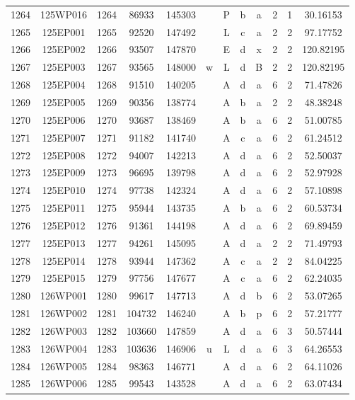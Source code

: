 \begin{tabular}{|*{12}{c|}}
1264 & 125WP016 & 1264 & 86933 & 145303 &  & P & b & a & 2 & 1 & 30.16153 \\ 
1265 & 125EP001 & 1265 & 92520 & 147492 &  & L & c & a & 2 & 2 & 97.17752 \\ 
1266 & 125EP002 & 1266 & 93507 & 147870 &  & E & d & x & 2 & 2 & 120.82195 \\ 
1267 & 125EP003 & 1267 & 93565 & 148000 & w & L & d & B & 2 & 2 & 120.82195 \\ 
1268 & 125EP004 & 1268 & 91510 & 140205 &  & A & d & a & 6 & 2 & 71.47826 \\ 
1269 & 125EP005 & 1269 & 90356 & 138774 &  & A & b & a & 2 & 2 & 48.38248 \\ 
1270 & 125EP006 & 1270 & 93687 & 138469 &  & A & b & a & 6 & 2 & 51.00785 \\ 
1271 & 125EP007 & 1271 & 91182 & 141740 &  & A & c & a & 6 & 2 & 61.24512 \\ 
1272 & 125EP008 & 1272 & 94007 & 142213 &  & A & d & a & 6 & 2 & 52.50037 \\ 
1273 & 125EP009 & 1273 & 96695 & 139798 &  & A & d & a & 6 & 2 & 52.97928 \\ 
1274 & 125EP010 & 1274 & 97738 & 142324 &  & A & d & a & 6 & 2 & 57.10898 \\ 
1275 & 125EP011 & 1275 & 95944 & 143735 &  & A & b & a & 6 & 2 & 60.53734 \\ 
1276 & 125EP012 & 1276 & 91361 & 144198 &  & A & d & a & 6 & 2 & 69.89459 \\ 
1277 & 125EP013 & 1277 & 94261 & 145095 &  & A & d & a & 2 & 2 & 71.49793 \\ 
1278 & 125EP014 & 1278 & 93944 & 147362 &  & A & c & a & 2 & 2 & 84.04225 \\ 
1279 & 125EP015 & 1279 & 97756 & 147677 &  & A & c & a & 6 & 2 & 62.24035 \\ 
1280 & 126WP001 & 1280 & 99617 & 147713 &  & A & d & b & 6 & 2 & 53.07265 \\ 
1281 & 126WP002 & 1281 & 104732 & 146240 &  & A & b & p & 6 & 2 & 57.21777 \\ 
1282 & 126WP003 & 1282 & 103660 & 147859 &  & A & d & a & 6 & 3 & 50.57444 \\ 
1283 & 126WP004 & 1283 & 103636 & 146906 & u & L & d & a & 6 & 3 & 64.26553 \\ 
1284 & 126WP005 & 1284 & 98363 & 146771 &  & A & d & a & 6 & 2 & 64.11026 \\ 
1285 & 126WP006 & 1285 & 99543 & 143528 &  & A & d & a & 6 & 2 & 63.07434 \\ 

\end{tabular}
